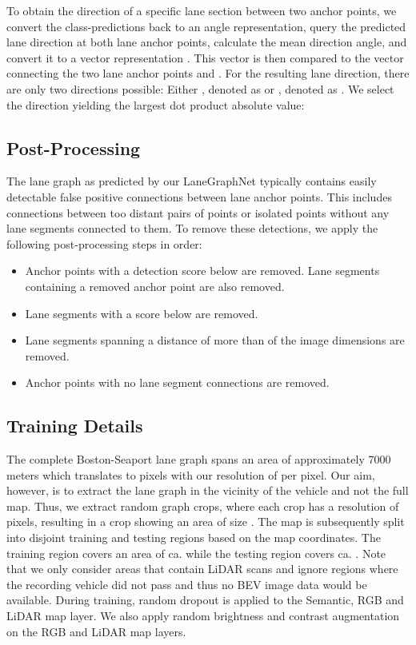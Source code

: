 \documentclass[letterpaper, 10 pt, conference]{ieeeconf}
\begin{document}
 

To obtain the direction of a specific lane section between two anchor points, we convert the class-predictions back to an angle representation, query the predicted lane direction at both lane anchor points, calculate the mean direction angle, and convert it to a vector representation . This vector is then compared to the vector connecting the two lane anchor points  and . For the resulting lane direction, there are only two directions possible: Either , denoted as  or , denoted as . We select the direction  yielding the largest dot product absolute value:




\subsection{Post-Processing}

The lane graph as predicted by our LaneGraphNet typically contains easily detectable false positive connections between lane anchor points. This includes connections between too distant pairs of points or isolated points without any lane segments connected to them. To remove these detections, we apply the following post-processing steps in order:

\begin{itemize}
    \item Anchor points with a detection score below  are removed. Lane segments containing a removed anchor point are also removed.
    \item Lane segments with a score below  are removed.
    \item Lane segments spanning a distance of more than  of the image dimensions are removed.
    \item Anchor points with no lane segment connections are removed.
\end{itemize}



\subsection{Training Details}

The complete Boston-Seaport lane graph spans an area of approximately 7000 meters which translates to  pixels with our resolution of  per pixel. Our aim, however, is to extract the lane graph in the vicinity of the vehicle and not the full map. Thus, we extract random graph crops, where each crop has a resolution of  pixels, resulting in a crop showing an area of size . The map is subsequently split into disjoint training and testing regions based on the map coordinates. The training region  covers an area of ca.  while the testing region covers ca. . Note that we only consider areas  that contain LiDAR scans and ignore regions where the recording vehicle did not pass and thus no BEV image data would be available. During training, random dropout is applied to the Semantic, RGB and LiDAR map layer. We also apply random brightness and contrast augmentation on the RGB and LiDAR map layers.
\end{document}
